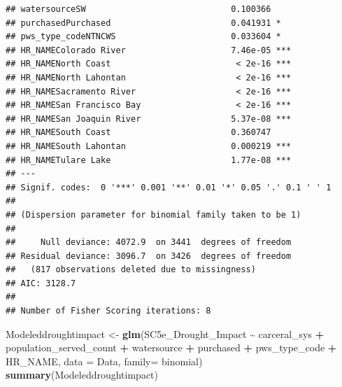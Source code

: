 \documentclass[
]{article}
\newenvironment{Shaded}{\begin{snugshade}}{\end{snugshade}}
\newcommand{\AttributeTok}[1]{\textcolor[rgb]{0.13,0.29,0.53}{#1}}
\newcommand{\FunctionTok}[1]{\textcolor[rgb]{0.13,0.29,0.53}{\textbf{#1}}}
\newcommand{\NormalTok}[1]{#1}
\newcommand{\OtherTok}[1]{\textcolor[rgb]{0.56,0.35,0.01}{#1}}
\newcommand{\SpecialCharTok}[1]{\textcolor[rgb]{0.81,0.36,0.00}{\textbf{#1}}}
\begin{document}
\begin{verbatim}
## watersourceSW                             0.100366    
## purchasedPurchased                        0.041931 *  
## pws_type_codeNTNCWS                       0.033604 *  
## HR_NAMEColorado River                     7.46e-05 ***
## HR_NAMENorth Coast                         < 2e-16 ***
## HR_NAMENorth Lahontan                      < 2e-16 ***
## HR_NAMESacramento River                    < 2e-16 ***
## HR_NAMESan Francisco Bay                   < 2e-16 ***
## HR_NAMESan Joaquin River                  5.37e-08 ***
## HR_NAMESouth Coast                        0.360747    
## HR_NAMESouth Lahontan                     0.000219 ***
## HR_NAMETulare Lake                        1.77e-08 ***
## ---
## Signif. codes:  0 '***' 0.001 '**' 0.01 '*' 0.05 '.' 0.1 ' ' 1
## 
## (Dispersion parameter for binomial family taken to be 1)
## 
##     Null deviance: 4072.9  on 3441  degrees of freedom
## Residual deviance: 3096.7  on 3426  degrees of freedom
##   (817 observations deleted due to missingness)
## AIC: 3128.7
## 
## Number of Fisher Scoring iterations: 8
\end{verbatim}

\begin{Shaded}
\begin{Highlighting}[]
\NormalTok{Modeleddroughtimpact }\OtherTok{\textless{}{-}} \FunctionTok{glm}\NormalTok{(SC5e\_Drought\_Impact }\SpecialCharTok{\textasciitilde{}}\NormalTok{ carceral\_sys }\SpecialCharTok{+}\NormalTok{ population\_served\_count }\SpecialCharTok{+}\NormalTok{ watersource }\SpecialCharTok{+}\NormalTok{ purchased }\SpecialCharTok{+}\NormalTok{ pws\_type\_code }\SpecialCharTok{+}\NormalTok{ HR\_NAME, }\AttributeTok{data =}\NormalTok{ Data, }\AttributeTok{family=}\NormalTok{ binomial)}
\FunctionTok{summary}\NormalTok{(Modeleddroughtimpact)}
\end{Highlighting}
\end{Shaded}
\end{document}
